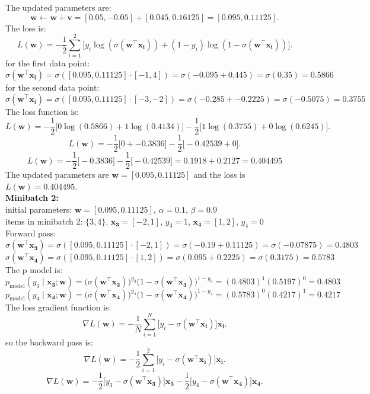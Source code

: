 \documentclass[a3paper,12pt]{article} %
\begin{document}
The updated parameters are:
\[
\mathbf{w} \gets \mathbf{w} + \mathbf{v} = [0.05, -0.05] + [0.045, 0.16125] = [0.095, 0.11125].
\]
The loss is:
\[
L(\mathbf{w}) = -\frac{1}{2} \sum^2_{i=1} \big[y_i \log(\sigma(\mathbf{w}^\top \mathbf{x_i})) + (1-y_i) \log(1-\sigma(\mathbf{w}^\top \mathbf{x_i}))\big].
\]
for the first data point:
\[
    \sigma(\mathbf{w}^\top \mathbf{x_i}) = \sigma([0.095, 0.11125] \cdot [-1, 4]) = \sigma(-0.095 + 0.445) = \sigma(0.35) = 0.5866
\]
for the second data point:
\[
    \sigma(\mathbf{w}^\top \mathbf{x_i}) = \sigma([0.095, 0.11125] \cdot [-3, -2]) = \sigma(-0.285 + -0.2225) = \sigma(-0.5075) = 0.3755
\]
The loss function is:
\[
L(\mathbf{w}) = -\frac{1}{2} \big[0 \log(0.5866) + 1 \log(0.4134)\big] - \frac{1}{2} \big[1 \log(0.3755) + 0 \log(0.6245)\big].
\]
\[
L(\mathbf{w}) = -\frac{1}{2} \big[0 + -0.3836\big] - \frac{1}{2} \big[-0.42539 + 0\big].
\]
\[
L(\mathbf{w}) = -\frac{1}{2} \big[-0.3836\big] - \frac{1}{2} \big[-0.42539\big] = 0.1918 + 0.2127 = 0.404495
\]
The updated parameters are \(\mathbf{w} = \mathbf{[0.095, 0.11125]}\) and the loss is \(L(\mathbf{w}) = \mathbf{0.404495}\).
\\ \textbf{Minibatch 2:}
\\ initial parameters: \(\mathbf{w} = [0.095, 0.11125]\), \(\alpha = 0.1\), \(\beta = 0.9\)
\\ items in minibatch 2: \(\{3, 4\}\), \(\mathbf{x_3} = [-2, 1]\), \(y_3 = 1\), \(\mathbf{x_4} = [1, 2]\), \(y_4 = 0\)
\\ Forward pass:
\[
\sigma(\mathbf{w}^\top \mathbf{x_3}) = \sigma([0.095, 0.11125] \cdot [-2, 1]) = \sigma(-0.19 + 0.11125) = \sigma(-0.07875) = 0.4803
\]
\[
\sigma(\mathbf{w}^\top \mathbf{x_4}) = \sigma([0.095, 0.11125] \cdot [1, 2]) = \sigma(0.095 + 0.2225) = \sigma(0.3175) = 0.5783
\]
The p model is:
\[
p_{\text{model}}(y_3 \mid \mathbf{x_3}; \mathbf{w}) = \big(\sigma(\mathbf{w}^\top \mathbf{x_3})\big)^{y_3} \big(1 - \sigma(\mathbf{w}^\top \mathbf{x_3})\big)^{1-y_3} = (0.4803)^1 (0.5197)^0 = 0.4803
\]
\[
p_{\text{model}}(y_4 \mid \mathbf{x_4}; \mathbf{w}) = \big(\sigma(\mathbf{w}^\top \mathbf{x_4})\big)^{y_4} \big(1 - \sigma(\mathbf{w}^\top \mathbf{x_4})\big)^{1-y_4} = (0.5783)^0 (0.4217)^1 = 0.4217
\]
The loss gradient function is:
\[
\nabla L(\mathbf{w}) = -\frac{1}{N} \sum^N_{i=1} \big[y_i - \sigma(\mathbf{w}^\top \mathbf{x_i})\big] \mathbf{x_i}.
\]  
so the backward pass is:
\[
\nabla L(\mathbf{w}) = -\frac{1}{2} \sum^2_{i=1} \big[y_i - \sigma(\mathbf{w}^\top \mathbf{x_i})\big] \mathbf{x_i}.
\]
\[
\nabla L(\mathbf{w}) = -\frac{1}{2} \big[y_3 - \sigma(\mathbf{w}^\top \mathbf{x_3})\big] \mathbf{x_3} - \frac{1}{2} \big[y_4 - \sigma(\mathbf{w}^\top \mathbf{x_4})\big] \mathbf{x_4}.
\]
\end{document}
